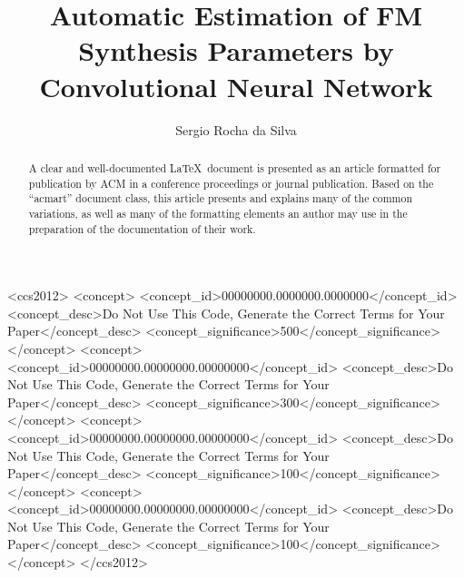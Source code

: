 \documentclass[sigconf,natbib=false]{acmart}
\begin{document}
\title{Automatic Estimation of FM Synthesis Parameters by Convolutional Neural Network}
\renewcommand{\shorttitle}{Hope it is}

\author{Sergio Rocha da Silva}

\renewcommand{\shortauthors}{B. Trovato et al.}

\begin{abstract}
  A clear and well-documented \LaTeX\ document is presented as an
  article formatted for publication by ACM in a conference proceedings
  or journal publication. Based on the ``acmart'' document class, this
  article presents and explains many of the common variations, as well
  as many of the formatting elements an author may use in the
  preparation of the documentation of their work.
\end{abstract}

\begin{CCSXML}
<ccs2012>
 <concept>
  <concept_id>00000000.0000000.0000000</concept_id>
  <concept_desc>Do Not Use This Code, Generate the Correct Terms for Your Paper</concept_desc>
  <concept_significance>500</concept_significance>
 </concept>
 <concept>
  <concept_id>00000000.00000000.00000000</concept_id>
  <concept_desc>Do Not Use This Code, Generate the Correct Terms for Your Paper</concept_desc>
  <concept_significance>300</concept_significance>
 </concept>
 <concept>
  <concept_id>00000000.00000000.00000000</concept_id>
  <concept_desc>Do Not Use This Code, Generate the Correct Terms for Your Paper</concept_desc>
  <concept_significance>100</concept_significance>
 </concept>
 <concept>
  <concept_id>00000000.00000000.00000000</concept_id>
  <concept_desc>Do Not Use This Code, Generate the Correct Terms for Your Paper</concept_desc>
  <concept_significance>100</concept_significance>
 </concept>
</ccs2012>
\end{CCSXML}
\end{document}
